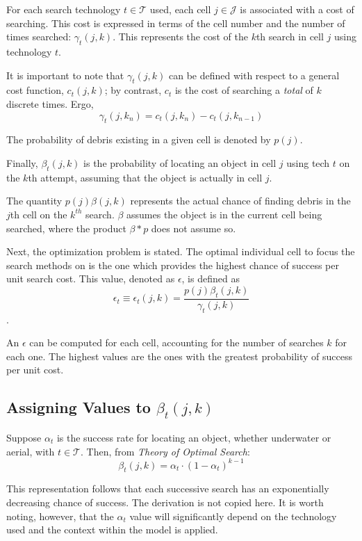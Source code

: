 \documentclass[a4paper]{article}
\begin{document}
For each search technology $t\in\mathcal{T}$ used, each cell $j\in\mathcal{J}$ is associated with a cost of searching. This cost is expressed in terms of the cell number and the number of times searched: $\gamma_t(j,k)$. This represents the cost of the $k$th search in cell $j$ using technology $t$.

It is important to note that $\gamma_t(j,k)$ can be defined with respect to a general cost function, $c_t(j,k)$; by contrast, $c_t$ is the cost of searching  a \textit{total} of $k$ discrete times. Ergo, $$\gamma_t(j,k_n)=c_t(j,k_n)-c_t(j,k_{n-1})$$

The probability of debris existing in a given cell is denoted by $p(j)$.

Finally, $\beta_t(j,k)$ is the probability of locating an object in cell $j$ using tech $t$ on the $k$th attempt, assuming that the object is actually in cell $j$.

The quantity $p(j)\beta(j,k)$ represents the actual chance of finding debris in the $j$th cell on the $k^{th}$ search. $\beta$ assumes the object is in the current cell being searched, where the product $\beta * p$ does not assume so.

Next, the optimization problem is stated. The optimal individual cell to focus the search methods on is the one which provides the highest chance of success per unit search cost. This value, denoted as $\epsilon$, is defined as $$\epsilon_t\equiv\epsilon_t(j,k)=\frac{p(j)\beta_t(j,k)}{\gamma_t(j,k)}$$. 

An $\epsilon$ can be computed for each cell, accounting for the number of searches $k$ for each one. The highest values are the ones with the greatest probability of success per unit cost. 

\subsection{Assigning Values to $\beta_t(j,k)$}

Suppose $\alpha_t$ is the success rate for locating an object, whether underwater or aerial, with $t\in\mathcal{T}$. Then, from \textit{Theory of Optimal Search}: \[\beta_t(j,k)=\alpha_t\cdot(1-\alpha_t)^{k-1}\]

This representation follows that each successive search has an exponentially decreasing chance of success. The derivation is not copied here. It is worth noting, however, that the $\alpha_t$ value will significantly depend on the technology used and the context within the model is applied.
\end{document}
